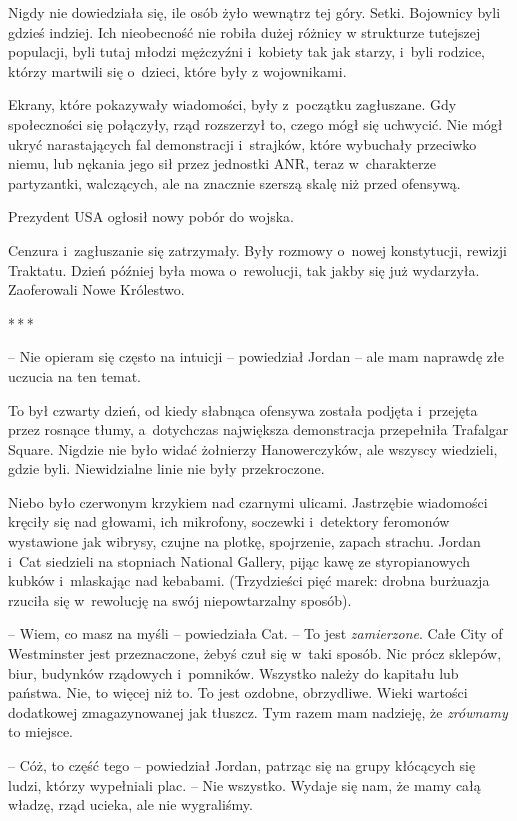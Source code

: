 \documentclass[oneside,polish,11pt,sfheadings]{mwbk}
\newcommand{\threeast}{\bigskip\par\centerline{*\,*\,*}\medskip\par}%
\begin{document}
Nigdy nie dowiedziała się, ile osób żyło wewnątrz tej góry. Setki.
Bojownicy byli gdzieś indziej. Ich nieobecność nie robiła dużej różnicy
w strukturze tutejszej populacji, byli tutaj młodzi mężczyźni i~kobiety
tak jak starzy, i~byli rodzice, którzy martwili się o~dzieci, które były
z wojownikami.

Ekrany, które pokazywały wiadomości, były z~początku zagłuszane. Gdy
społeczności się połączyły, rząd rozszerzył to, czego mógł się uchwycić.
Nie mógł ukryć narastających fal demonstracji i~strajków, które
wybuchały przeciwko niemu, lub nękania jego sił przez jednostki ANR,
teraz w~charakterze partyzantki, walczących, ale na znacznie szerszą
skalę niż przed ofensywą.

Prezydent USA ogłosił nowy pobór do wojska.

Cenzura i~zagłuszanie się zatrzymały. Były rozmowy o~nowej konstytucji,
rewizji Traktatu. Dzień później była mowa o~rewolucji, tak jakby się już
wydarzyła. Zaoferowali Nowe Królestwo.
  \threeast 

-- Nie opieram się często na intuicji -- powiedział Jordan -- ale mam
naprawdę złe uczucia na ten temat.

To był czwarty dzień, od kiedy słabnąca ofensywa została podjęta i~przejęta przez rosnące tłumy, a~dotychczas największa demonstracja
przepełniła Trafalgar Square. Nigdzie nie było widać żołnierzy
Hanowerczyków, ale wszyscy wiedzieli, gdzie byli. Niewidzialne linie nie
były przekroczone.

Niebo było czerwonym krzykiem nad czarnymi ulicami. Jastrzębie
wiadomości kręciły się nad głowami, ich mikrofony, soczewki i~detektory
feromonów wystawione jak wibrysy, czujne na plotkę, spojrzenie, zapach
strachu. Jordan i~Cat siedzieli na stopniach National Gallery, pijąc
kawę ze styropianowych kubków i~mlaskając nad kebabami. (Trzydzieści
pięć marek: drobna burżuazja rzuciła się w~rewolucję na swój
niepowtarzalny sposób).

-- Wiem, co masz na myśli -- powiedziała Cat. -- To jest \emph{zamierzone}.
Całe City of Westminster jest przeznaczone, żebyś czuł się w~taki
sposób. Nic prócz sklepów, biur, budynków rządowych i~pomników. Wszystko
należy do kapitału lub państwa. Nie, to więcej niż to. To jest ozdobne,
obrzydliwe. Wieki wartości dodatkowej zmagazynowanej jak tłuszcz. Tym
razem mam nadzieję, że \emph{zrównamy} to miejsce.

-- Cóż, to część tego -- powiedział Jordan, patrząc się na grupy kłócących
się ludzi, którzy wypełniali plac. -- Nie wszystko. Wydaje się nam, że
mamy całą władzę, rząd ucieka, ale nie wygraliśmy.
\end{document}
